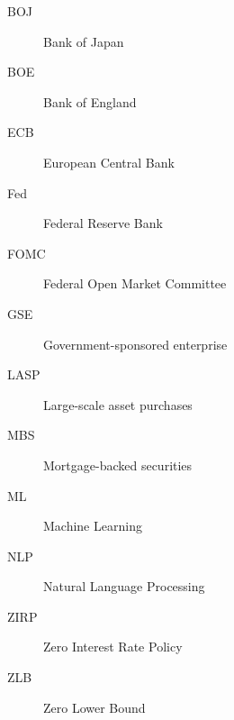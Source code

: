 %
\begin{description}
	\item[BOJ] Bank of Japan
	\item[BOE] Bank of England
	\item[ECB] European Central Bank
	\item[Fed] Federal Reserve Bank
	\item[FOMC] Federal Open Market Committee
	\item[GSE] Government-sponsored enterprise
	\item[LASP] Large-scale asset purchases
	\item[MBS] Mortgage-backed securities
	\item[ML] Machine Learning
	\item[NLP] Natural Language Processing
	\item[ZIRP] Zero Interest Rate Policy
	\item[ZLB] Zero Lower Bound
\end{description}